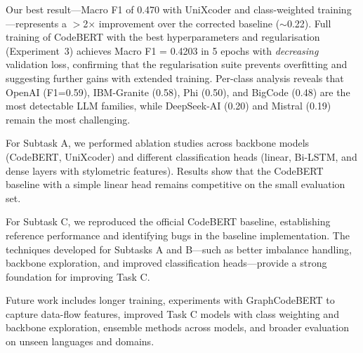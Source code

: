 \documentclass[11pt]{article}
\begin{document}
Our best result---Macro F1 of 0.470 with UniXcoder and class-weighted training---represents a $>$2$\times$ improvement over the corrected baseline ($\sim$0.22). Full training of CodeBERT with the best hyperparameters and regularisation (Experiment~3) achieves Macro F1 = 0.4203 in 5 epochs with \emph{decreasing} validation loss, confirming that the regularisation suite prevents overfitting and suggesting further gains with extended training. Per-class analysis reveals that OpenAI (F1=0.59), IBM-Granite (0.58), Phi (0.50), and BigCode (0.48) are the most detectable LLM families, while DeepSeek-AI (0.20) and Mistral (0.19) remain the most challenging.

For Subtask A, we performed ablation studies across backbone models (CodeBERT, UniXcoder) and different classification heads (linear, Bi-LSTM, and dense layers with stylometric features). Results show that the CodeBERT baseline with a simple linear head remains competitive on the small evaluation set.

For Subtask C, we reproduced the official CodeBERT baseline, establishing reference performance and identifying bugs in the baseline implementation. The techniques developed for Subtasks A and B—such as better imbalance handling, backbone exploration, and improved classification heads—provide a strong foundation for improving Task C.

Future work includes longer training, experiments with GraphCodeBERT to capture data-flow features, improved Task C models with class weighting and backbone exploration, ensemble methods across models, and broader evaluation on unseen languages and domains. 

\nocite{*}



%

\end{document}
